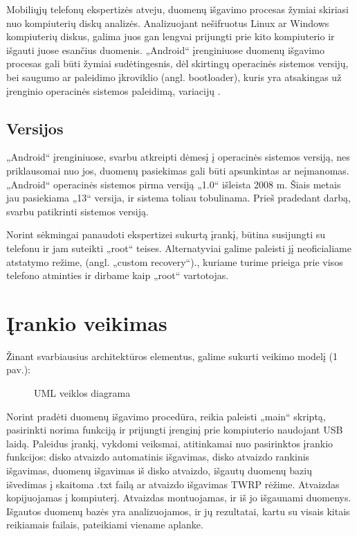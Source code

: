 \documentclass[a4paper,12pt,fleqn]{article}
\begin{document}
Mobiliųjų telefonų ekspertizės atveju, duomenų išgavimo procesas žymiai skiriasi nuo kompiuterių diskų analizės. \cite{forensicsPCvsPHONE} Analizuojant nešifruotus Linux ar Windows kompiuterių diskus, galima juos gan lengvai prijungti prie kito kompiuterio ir išgauti juose esančius duomenis. „Android“ įrenginiuose duomenų išgavimo procesas gali būti žymiai sudėtingesnis, dėl skirtingų operacinės sistemos versijų, bei saugumo ar paleidimo įkroviklio (angl. bootloader),  kuris yra atsakingas už įrenginio operacinės sistemos paleidimą, variacijų \cite{bootloaderdiff}.

\subsection{Versijos}
„Android“ įrenginiuose, svarbu atkreipti dėmesį į operacinės sistemos versiją, nes priklausomai nuo jos, duomenų pasiekimas gali būti apsunkintas ar neįmanomas.
„Android“ operacinės sistemos pirma versiją „1.0“ išleista 2008 m. \cite{AndroidFirstVersion} Šiais metais jau pasiekiama „13“ versija, ir sistema toliau tobulinama. Prieš pradedant darbą, svarbu patikrinti sistemos versiją.

Norint sėkmingai panaudoti ekspertizei sukurtą įrankį, būtina susijungti su telefonu ir jam suteikti „root“ teises. Alternatyviai galime paleisti jį neoficialiame atstatymo režime, (angl. „custom recovery“)., kuriame turime prieiga prie visos telefono atminties ir dirbame kaip „root“ vartotojas.

\section{Įrankio veikimas}

Žinant svarbiausius architektūros elementus, galime sukurti veikimo modelį (1 pav.):
\begin{figure} [h]
    \centering
      
    \caption{UML veiklos diagrama}
    \label{fig:flowchart}
\end{figure}


Norint pradėti duomenų išgavimo procedūra, reikia paleisti „main“ skriptą, pasirinkti norima funkciją ir prijungti įrenginį prie kompiuterio naudojant USB laidą. Paleidus įrankį, vykdomi veiksmai, atitinkamai nuo pasirinktos įrankio funkcijos: disko atvaizdo automatinis išgavimas, disko atvaizdo rankinis išgavimas, duomenų išgavimas iš disko atvaizdo, išgautų duomenų bazių išvedimas į skaitoma .txt failą ar atvaizdo išgavimas TWRP rėžime. Atvaizdas kopijuojamas į kompiuterį. Atvaizdas montuojamas, ir iš jo išgaunami duomenys. Išgautos duomenų bazės yra analizuojamos, ir jų rezultatai, kartu su visais kitais reikiamais failais, pateikiami viename aplanke.
\end{document}

